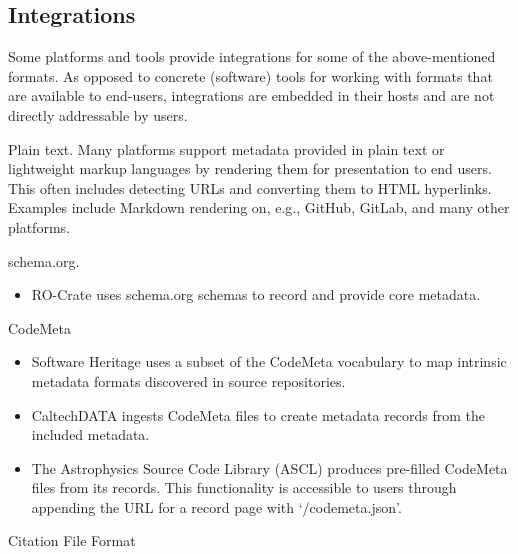 \documentclass{article}
\begin{document}
\subsection{Integrations}\label{l4z04rrnn4ah}
Some platforms and tools provide integrations for some of the above-mentioned formats. As opposed to concrete (software) tools for working with formats that are available to end-users, integrations are embedded in their hosts and are not directly addressable by users.

Plain text. Many platforms support metadata provided in plain text or lightweight markup languages by rendering them for presentation to end users. This often includes detecting URLs and converting them to HTML hyperlinks. Examples include Markdown rendering on, e.g., GitHub, GitLab, and many other platforms.

schema.org.

\begin{itemize}  
\item  RO-Crate uses schema.org schemas to record and provide core metadata.


\end{itemize}CodeMeta 

\begin{itemize}  
\item Software Heritage uses a subset of the CodeMeta vocabulary to map intrinsic metadata formats discovered in source repositories.


\item CaltechDATA ingests CodeMeta files to create metadata records from the included metadata.


\item The Astrophysics Source Code Library (ASCL) produces pre-filled CodeMeta files from its records. This functionality is accessible to users through appending the URL for a record page with ‘/codemeta.json’.


\end{itemize}Citation File Format 
\end{document}
